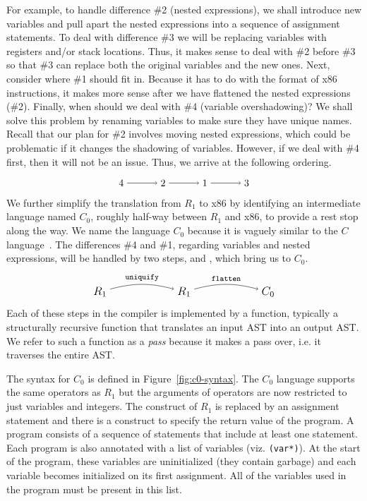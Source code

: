 \documentclass[11pt]{book}
\begin{document}
For example, to handle difference \#2 (nested expressions), we shall
introduce new variables and pull apart the nested expressions into a
sequence of assignment statements.  To deal with difference \#3 we
will be replacing variables with registers and/or stack
locations. Thus, it makes sense to deal with \#2 before \#3 so that
\#3 can replace both the original variables and the new ones. Next,
consider where \#1 should fit in. Because it has to do with the format
of x86 instructions, it makes more sense after we have flattened the
nested expressions (\#2). Finally, when should we deal with \#4
(variable overshadowing)?  We shall solve this problem by renaming
variables to make sure they have unique names. Recall that our plan
for \#2 involves moving nested expressions, which could be problematic
if it changes the shadowing of variables. However, if we deal with \#4
first, then it will not be an issue.  Thus, we arrive at the following
ordering.
\[
\begin{tikzpicture}[baseline=(current  bounding  box.center)]
\foreach \i/\p in {4/1,2/2,1/3,3/4}
{ 
  \node (\i) at (\p*1.5,0) {$\i$};
}
\foreach \x/\y in {4/2,2/1,1/3}
{
  \draw[->] (\x) to (\y);
}
\end{tikzpicture}
\]
We further simplify the translation from $R_1$ to x86 by identifying
an intermediate language named $C_0$, roughly half-way between $R_1$
and x86, to provide a rest stop along the way. We name the language
$C_0$ because it is vaguely similar to the $C$
language~\citep{Kernighan:1988nx}. The differences \#4 and \#1,
regarding variables and nested expressions, will be handled by two
steps,  and , which bring us to
$C_0$.
\[
\begin{tikzpicture}[baseline=(current  bounding  box.center)]
\foreach \i/\p in {R_1/1,R_1/2,C_0/3}
{ 
  \node (\p) at (\p*3,0) {\large $\i$};
}
\foreach \x/\y/\lbl in {1/2/uniquify,2/3/flatten}
{
 \path[->,bend left=15] (\x) edge [above] node {\ttfamily\footnotesize \lbl} (\y);
}
\end{tikzpicture}
\]
Each of these steps in the compiler is implemented by a function,
typically a structurally recursive function that translates an input
AST into an output AST. We refer to such a function as a \emph{pass}
because it makes a pass over, i.e. it traverses the entire AST.

The syntax for $C_0$ is defined in Figure~\ref{fig:c0-syntax}.  The
$C_0$ language supports the same operators as $R_1$ but the arguments
of operators are now restricted to just variables and integers. The
 construct of $R_1$ is replaced by an assignment statement
and there is a  construct to specify the return value of
the program. A program consists of a sequence of statements that
include at least one  statement. Each program is also
annotated with a list of variables (viz. {\tt (var*)}). At the start
of the program, these variables are uninitialized (they contain garbage)
and each variable becomes initialized on its first assignment. All of
the variables used in the program must be present in this list.
\end{document}
